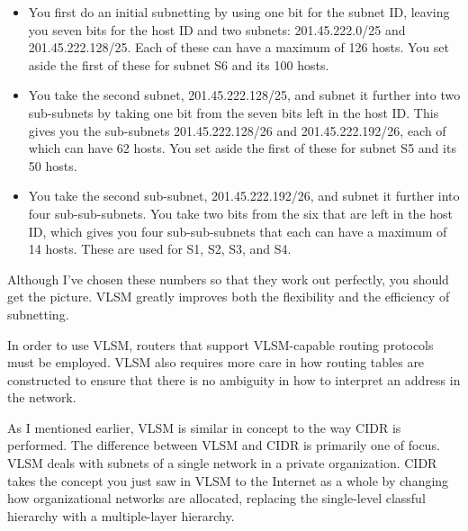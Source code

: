 \begin{itemize}
\item
  You first do an initial subnetting by using one bit for the subnet ID,
  leaving you seven bits for the host ID and two subnets:
  201.45.222.0/25 and 201.45.222.128/25. Each of these can have a
  maximum of 126 hosts. You set aside the first of these for subnet S6
  and its 100 hosts.
\item
  You take the second subnet, 201.45.222.128/25, and subnet it further
  into two sub-subnets by taking one bit from the seven bits left in the
  host ID. This gives you the sub-subnets 201.45.222.128/26 and
  201.45.222.192/26, each of which can have 62 hosts. You set aside the
  first of these for subnet S5 and its 50 hosts.
\item
  You take the second sub-subnet, 201.45.222.192/26, and subnet it
  further into four sub-sub-subnets. You take two bits from the six that
  are left in the host ID, which gives you four sub-sub-subnets that
  each can have a maximum of 14 hosts. These are used for S1, S2, S3,
  and S4.
\end{itemize}

Although I've chosen these numbers so that they work out perfectly, you
should get the picture. VLSM greatly improves both the flexibility and
the efficiency of subnetting.


\begin{note}
In order to use VLSM, routers that support VLSM-capable routing protocols must be employed.
VLSM also requires more care in how routing tables are constructed to ensure that there is no ambiguity in how to interpret an address in the network.
\end{note}

As I mentioned earlier, VLSM is similar in concept to the way CIDR is performed.
The difference between VLSM and CIDR is primarily one of focus.
VLSM deals with subnets of a single network in a private organization.
CIDR takes the concept you just saw in VLSM to the Internet as a whole by changing how organizational networks are allocated,
replacing the single-level classful hierarchy with a multiple-layer hierarchy.
